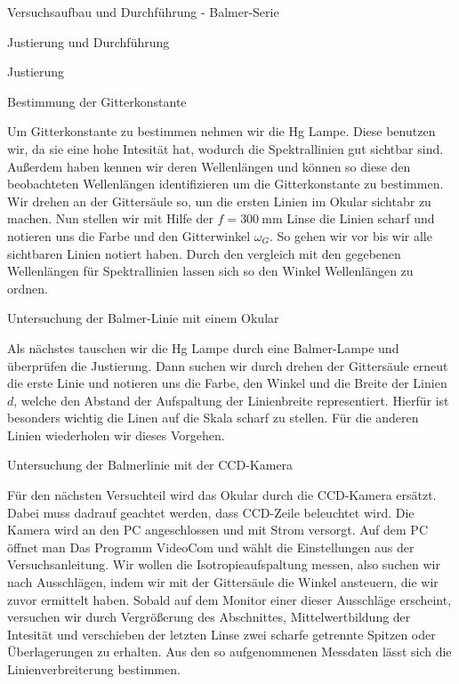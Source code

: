 \documentclass[pdftex, a4paper,11pt, twoside, ngerman]{report}
\begin{document}
\begin{chapter}{Versuchsaufbau und Durchführung - Balmer-Serie}
\begin{section}{Justierung und Durchführung}
\begin{subsection}{Justierung}
      \end{subsection}

      \begin{subsection}{Bestimmung der Gitterkonstante}

          Um Gitterkonstante zu bestimmen nehmen wir die Hg Lampe.
          Diese benutzen wir, da sie eine hohe Intesität hat, wodurch die Spektrallinien gut sichtbar sind.
          Außerdem haben kennen wir deren Wellenlängen und können so diese den beobachteten Wellenlängen identifizieren um die Gitterkonstante zu bestimmen.
          Wir drehen an der Gittersäule so, um die ersten Linien im Okular sichtabr zu machen.
          Nun stellen wir mit Hilfe der $f=\SI{300}{\milli\meter}$ Linse die Linien scharf und notieren uns die Farbe und den Gitterwinkel $\omega_G$. 
          So gehen wir vor bis wir alle sichtbaren Linien notiert haben.
          Durch den vergleich mit den gegebenen Wellenlängen für Spektrallinien lassen sich so den Winkel Wellenlängen zu ordnen.

      \end{subsection}

      \begin{subsection}{Untersuchung der Balmer-Linie mit einem Okular}

          Als nächstes tauschen wir die Hg Lampe durch eine Balmer-Lampe und überprüfen die Justierung.
          Dann suchen wir durch drehen der Gittersäule erneut die erste Linie und notieren uns die Farbe, den Winkel und die Breite der Linien $d$, welche den Abstand der Aufspaltung der Linienbreite representiert.
          Hierfür ist besonders wichtig die Linen auf die Skala scharf zu stellen.
          Für die anderen Linien wiederholen wir dieses Vorgehen.

      \end{subsection}

      \begin{subsection}{Untersuchung der Balmerlinie mit der CCD-Kamera}

          Für den nächsten Versuchteil wird das Okular durch die CCD-Kamera ersätzt. 
          Dabei muss dadrauf geachtet werden, dass CCD-Zeile beleuchtet wird.
          Die Kamera wird an den PC angeschlossen und mit Strom versorgt.
          Auf dem PC öffnet man Das Programm VideoCom und wählt die Einstellungen aus der Versuchsanleitung.
          Wir wollen die Isotropieaufspaltung messen, also suchen wir nach Ausschlägen, indem wir mit der Gittersäule die Winkel ansteuern, die wir zuvor ermittelt haben.
          Sobald auf dem Monitor einer dieser Ausschläge erscheint, versuchen wir durch Vergrößerung des Abschnittes, Mittelwertbildung der Intesität und verschieben der letzten Linse zwei scharfe getrennte Spitzen oder Überlagerungen zu erhalten.
          Aus den so aufgenommenen Messdaten lässt sich die Linienverbreiterung bestimmen.


\end{subsection}
\end{section}
\end{chapter}
\end{document}
